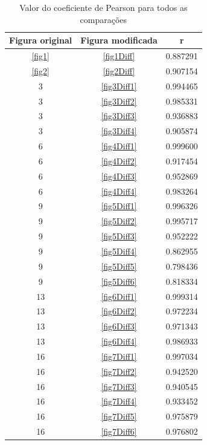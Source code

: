 \documentclass[10pt,a4paper]{article}
\begin{document}
\begin{table}[h!]
  \begin{center}
    \caption{Valor do coeficiente de Pearson para todos as comparações}
    \begin{tabular}{|c|c|c|}
      \hline
      Figura original & Figura modificada & r\\
      \hline
      \ref{fig1} &  \ref{fig1Diff} &  0.887291 \\
      \ref{fig2} &  \ref{fig2Diff} &  0.907154\\
      3 &  \ref{fig3Diff1} & 0.994465\\
      3 & \ref{fig3Diff2} &  0.985331\\
      3 &  \ref{fig3Diff3} &  0.936883\\
      3 &  \ref{fig3Diff4} &  0.905874\\
      6 &  \ref{fig4Diff1} & 0.999600\\
      6 &  \ref{fig4Diff2} &  0.917454\\
      6 &  \ref{fig4Diff3} &   0.952869\\
      6 &  \ref{fig4Diff4} &   0.983264\\
      9 &  \ref{fig5Diff1} & 0.996326\\
      9 &  \ref{fig5Diff2} & 0.995717\\
      9 &  \ref{fig5Diff3} & 0.952222\\
      9 &  \ref{fig5Diff4} & 0.862955\\
      9 &  \ref{fig5Diff5} & 0.798436\\
      9 &  \ref{fig5Diff6} & 0.818334\\
      13 &  \ref{fig6Diff1} & 0.999314\\
      13 &  \ref{fig6Diff2} & 0.972234\\
      13 &  \ref{fig6Diff3} & 0.971343\\
      13 &  \ref{fig6Diff4} & 0.986933\\
      16 &  \ref{fig7Diff1} & 0.997034\\
      16 &  \ref{fig7Diff2} & 0.942520\\
      16 &  \ref{fig7Diff3} & 0.940545\\
      16 &  \ref{fig7Diff4} & 0.933452\\
      16 &  \ref{fig7Diff5} & 0.975879\\
      16 &  \ref{fig7Diff6} & 0.976802\\
      \hline
    \end{tabular}
  \end{center}\label{tab:final}
\end{table}
\end{document}
